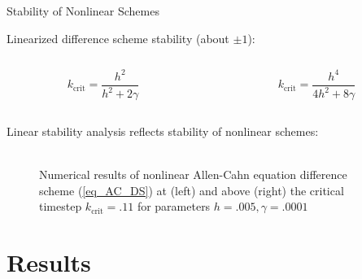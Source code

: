 \documentclass[professionalfont]{beamer}
\theoremstyle{remark}
\begin{document}
\begin{frame}{Stability of Nonlinear Schemes}
	
	Linearized difference scheme stability (about $\pm1$):
	\begin{columns}
		\begin{column}{.45\paperwidth}
			\begin{equation}
				k_{\text{crit}}= \frac{h^2}{h^2+2\gamma}\tag{AC}
			\end{equation}
		\end{column}
		\begin{column}{.45\paperwidth}
			\begin{equation}
				k_{\text{crit}}= \frac{h^4}{4h^2+8\gamma}\tag{CH}
			\end{equation}
		\end{column}
	\end{columns}
	Linear stability analysis reflects stability of nonlinear schemes:

	\vspace{-5 pt}

	\begin{figure} 
		\centering

		\\ Numerical results of nonlinear Allen-Cahn equation difference scheme (\ref{eq_AC_DS}) at (left) and above (right) the critical timestep $k_\text{crit}=.11$ for parameters $h=.005,\gamma=.0001$
	\end{figure}
	
\end{frame}

\section{Results}
\end{document}
